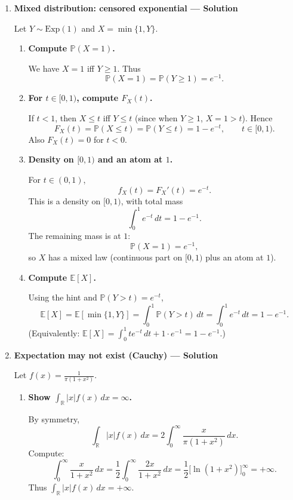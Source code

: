 \documentclass[11pt]{article}
\begin{document}
\begin{enumerate}
\item \textbf{Mixed distribution: censored exponential — Solution}

Let $Y\sim\mathrm{Exp}(1)$ and $X=\min\{1,Y\}$.

\begin{enumerate}[label=(\alph*)]
\item \textbf{Compute $\mathbb{P}(X=1)$.}

We have $X=1$ iff $Y\ge 1$. Thus
\[
\mathbb{P}(X=1)=\mathbb{P}(Y\ge1)=e^{-1}.
\]

\item \textbf{For $t\in[0,1)$, compute $F_X(t)$.}

If $t<1$, then $X\le t$ iff $Y\le t$ (since when $Y\ge1$, $X=1>t$). Hence
\[
F_X(t)=\mathbb{P}(X\le t)=\mathbb{P}(Y\le t)=1-e^{-t},
\qquad t\in[0,1).
\]
Also $F_X(t)=0$ for $t<0$.

\item \textbf{Density on $[0,1)$ and an atom at $1$.}

For $t\in(0,1)$,
\[
f_X(t)=F_X'(t)=e^{-t}.
\]
This is a density on $[0,1)$, with total mass
\[
\int_0^1 e^{-t}\,dt=1-e^{-1}.
\]
The remaining mass is at $1$:
\[
\mathbb{P}(X=1)=e^{-1},
\]
so $X$ has a mixed law (continuous part on $[0,1)$ plus an atom at $1$).

\item \textbf{Compute $\mathbb{E}[X]$.}

Using the hint and $\mathbb{P}(Y>t)=e^{-t}$,
\[
\mathbb{E}[X]=\mathbb{E}[\min\{1,Y\}]
=\int_0^1 \mathbb{P}(Y>t)\,dt
=\int_0^1 e^{-t}\,dt
=1-e^{-1}.
\]
(Equivalently: $\mathbb{E}[X]=\int_0^1 t e^{-t}\,dt + 1\cdot e^{-1}=1-e^{-1}$.)
\end{enumerate}

\item \textbf{Expectation may not exist (Cauchy) — Solution}

Let $f(x)=\frac{1}{\pi(1+x^2)}$.

\begin{enumerate}[label=(\alph*)]
\item \textbf{Show $\int_{\mathbb{R}} |x| f(x)\,dx = \infty$.}

By symmetry,
\[
\int_{\mathbb{R}} |x| f(x)\,dx
=2\int_0^\infty \frac{x}{\pi(1+x^2)}\,dx.
\]
Compute:
\[
\int_0^\infty \frac{x}{1+x^2}\,dx
=
\frac12\int_0^\infty \frac{2x}{1+x^2}\,dx
=
\frac12\Big[\ln(1+x^2)\Big]_{0}^{\infty}
=+\infty.
\]
Thus $\int_{\mathbb{R}} |x| f(x)\,dx=+\infty$.


\end{enumerate}
\end{enumerate}
\end{document}
